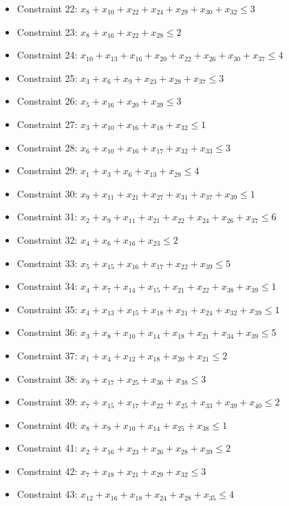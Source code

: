 \documentclass[11pt]{article}
\begin{document}
\begin{itemize}
\item Constraint 22: $x_{8} + x_{10} + x_{22} + x_{24} + x_{29} + x_{30} + x_{32} \le 3$
\item Constraint 23: $x_{8} + x_{16} + x_{22} + x_{28} \le 2$
\item Constraint 24: $x_{10} + x_{13} + x_{16} + x_{20} + x_{22} + x_{26} + x_{30} + x_{37} \le 4$
\item Constraint 25: $x_{3} + x_{6} + x_{9} + x_{23} + x_{28} + x_{37} \le 3$
\item Constraint 26: $x_{5} + x_{16} + x_{20} + x_{39} \le 3$
\item Constraint 27: $x_{3} + x_{10} + x_{16} + x_{18} + x_{32} \le 1$
\item Constraint 28: $x_{6} + x_{10} + x_{16} + x_{17} + x_{32} + x_{33} \le 3$
\item Constraint 29: $x_{1} + x_{3} + x_{6} + x_{13} + x_{28} \le 4$
\item Constraint 30: $x_{9} + x_{11} + x_{21} + x_{27} + x_{31} + x_{37} + x_{39} \le 1$
\item Constraint 31: $x_{2} + x_{9} + x_{11} + x_{21} + x_{22} + x_{24} + x_{26} + x_{37} \le 6$
\item Constraint 32: $x_{4} + x_{6} + x_{16} + x_{23} \le 2$
\item Constraint 33: $x_{5} + x_{15} + x_{16} + x_{17} + x_{22} + x_{39} \le 5$
\item Constraint 34: $x_{4} + x_{7} + x_{14} + x_{15} + x_{21} + x_{22} + x_{38} + x_{39} \le 1$
\item Constraint 35: $x_{4} + x_{13} + x_{15} + x_{18} + x_{21} + x_{24} + x_{32} + x_{39} \le 1$
\item Constraint 36: $x_{3} + x_{8} + x_{10} + x_{14} + x_{18} + x_{21} + x_{34} + x_{39} \le 5$
\item Constraint 37: $x_{1} + x_{4} + x_{12} + x_{18} + x_{20} + x_{21} \le 2$
\item Constraint 38: $x_{9} + x_{17} + x_{25} + x_{36} + x_{38} \le 3$
\item Constraint 39: $x_{7} + x_{15} + x_{17} + x_{22} + x_{25} + x_{33} + x_{39} + x_{40} \le 2$
\item Constraint 40: $x_{8} + x_{9} + x_{10} + x_{14} + x_{25} + x_{38} \le 1$
\item Constraint 41: $x_{2} + x_{16} + x_{23} + x_{26} + x_{28} + x_{39} \le 2$
\item Constraint 42: $x_{7} + x_{18} + x_{21} + x_{29} + x_{32} \le 3$
\item Constraint 43: $x_{12} + x_{16} + x_{18} + x_{24} + x_{28} + x_{35} \le 4$

\end{itemize}
\end{document}
